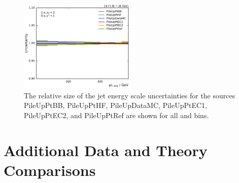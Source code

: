 \begin{figure}[htbp]
    \includegraphics[width=0.49\textwidth]{figures/measurement/jec_relunc_5_yb2ys0.pdf}
    \caption[Split-up of JEC uncertainty sources: Part VI]{The relative size of the jet energy scale
             uncertainties for the sources PileUpPtBB, PileUpPtHF, PileUpDataMC,
             PileUpPtEC1, PileUpPtEC2, and PileUpPtRef are shown for all \ystar and \yboost bins.}
    \label{fig:jec_relunc_5}
\end{figure}


\section{Additional Data and Theory Comparisons}
%

